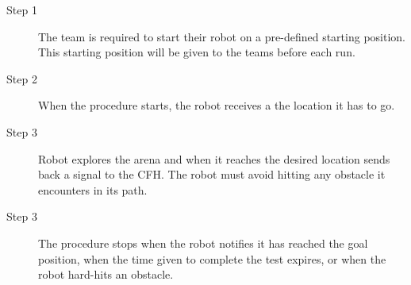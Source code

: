 \begin{description}
  \item [Step 1] The team is required to start their robot on a pre-defined starting position. This starting position will be given to the teams before each run.
  \item [Step 2] When the procedure starts, the robot receives a the location it has to go.
  \item [Step 3] Robot explores the arena and when it reaches the desired location sends back a signal to the CFH. The robot must avoid hitting any obstacle it encounters in its path.
  \item [Step 3] The procedure stops when the robot notifies it has reached the goal position, when the time given to complete the test expires, or when the robot hard-hits an obstacle.
\end{description}





